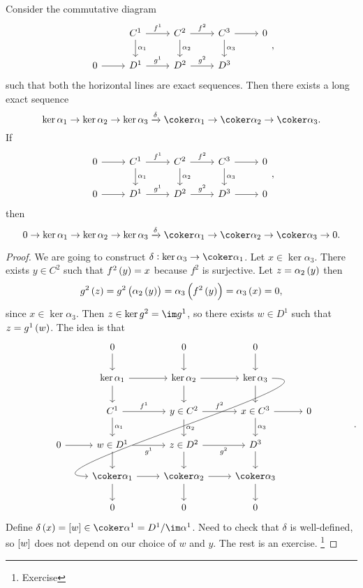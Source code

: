\begin{lemma}
Consider the commutative diagram
$$
\begin{tikzcd}
& C^1 \arrow{r}{f^1} \arrow{d}{\alpha_1} & C^2 \arrow{r}{f^2} \arrow{d}{\alpha_2} & C^3 \arrow{r} \arrow{d}{\alpha_3} & 0 \\
0 \arrow{r} & D^1 \arrow{r}{g^1} & D^2 \arrow{r}{g^2} & D^3 &
\end{tikzcd},
$$
such that both the horizontal lines are exact sequences. Then there exists a long exact sequence
$$ \ker \alpha_1 \to \ker \alpha_2 \to \ker \alpha_3 \xrightarrow{\delta} \coker \alpha_1 \to \coker \alpha_2 \to \coker \alpha_3. $$
If
$$
\begin{tikzcd}
0 \arrow{r} & C^1 \arrow{r}{f^1} \arrow{d}{\alpha_1} & C^2 \arrow{r}{f^2} \arrow{d}{\alpha_2} & C^3 \arrow{r} \arrow{d}{\alpha_3} & 0 \\
0 \arrow{r} & D^1 \arrow{r}{g^1} & D^2 \arrow{r}{g^2} & D^3 \arrow{r} & 0
\end{tikzcd},
$$
then
$$ 0 \to \ker \alpha_1 \to \ker \alpha_2 \to \ker \alpha_3 \xrightarrow{\delta} \coker \alpha_1 \to \coker \alpha_2 \to \coker \alpha_3 \to 0. $$
\end{lemma}

\begin{proof}
We are going to construct $ \delta : \ker \alpha_3 \to \coker \alpha_1 $. Let $ x \in \ker \alpha_3 $. There exists $ y \in C^2 $ such that $ f^2\br{y} = x $ because $ f^2 $ is surjective. Let $ z = \alpha_2\br{y} $ then
$$ g^2\br{z} = g^2\br{\alpha_2\br{y}} = \alpha_3\br{f^2\br{y}} = \alpha_3\br{x} = 0, $$
since $ x \in \ker \alpha_3 $. Then $ z \in \ker g^2 = \im g^1 $, so there exists $ w \in D^1 $ such that $ z = g^1\br{w} $. The idea is that
$$
\begin{tikzcd}
& 0 \arrow{d} & 0 \arrow{d} & 0 \arrow{d} & \\
& \ker \alpha_1 \arrow{r} \arrow{d} & \ker \alpha_2 \arrow{r} \arrow{d} & \ker \alpha_3 \arrow{d} \arrow[in=180, out=0]{dddll} & \\
& C^1 \arrow{r}{f^1} \arrow{d}{\alpha_1} & y \in C^2 \arrow{r}{f^2} \arrow{d}{\alpha_2} & x \in C^3 \arrow{r} \arrow{d}{\alpha_3} & 0 \\
0 \arrow{r} & w \in D^1 \arrow{r}[swap]{g^1} \arrow{d} & z \in D^2 \arrow{r}[swap]{g^2} \arrow{d} & D^3 \arrow{d} &\\
& \coker \alpha_1 \arrow{r} \arrow{d} & \coker \alpha_2 \arrow{r} \arrow{d} & \coker \alpha_3 \arrow{d} & \\
& 0 & 0 & 0 &
\end{tikzcd}.
$$
Define $ \delta\br{x} = \sbr{w} \in \coker \alpha^1 = D^1 / \im \alpha^1 $. Need to check that $ \delta $ is well-defined, so $ \sbr{w} $ does not depend on our choice of $ w $ and $ y $. The rest is an exercise. \footnote{Exercise}
\end{proof}

